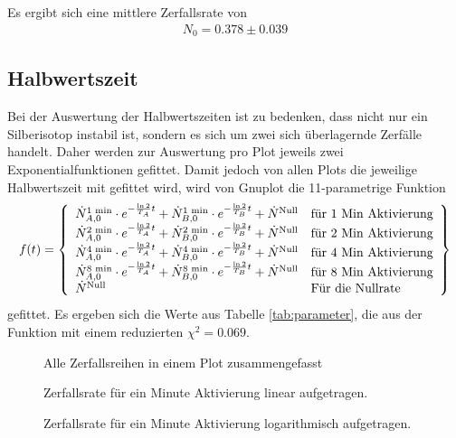 \documentclass[12pt,a4paper,titlepage,headinclude,bibtotoc]{scrartcl}
\begin{document}
Es ergibt sich eine mittlere Zerfallsrate von 
\begin{align}
N_0=0.378\pm 0.039\label{eq:nullrate}
\end{align}


\subsection{Halbwertszeit}
Bei der Auswertung der Halbwertszeiten ist zu bedenken, dass nicht nur ein Silberisotop instabil ist, sondern es sich um zwei sich überlagernde Zerfälle handelt.
Daher werden zur Auswertung pro Plot jeweils zwei Exponentialfunktionen gefittet.
Damit jedoch von allen Plots die jeweilige Halbwertszeit mit gefittet wird, wird von Gnuplot die 11-parametrige Funktion 
\begin{align}
	f(t)=\left\{
		\begin{array}[]{l  l}
\dot{N}_{A,0}^{1\text{ min}}\cdot e^{-\frac{\ln 2}{T_A}t}+\dot{N}_{B,0}^{1\text{ min}}\cdot e^{-\frac{\ln 2}{T_B}t}+\dot{N}^{\text{Null}}&\text{für 1 Min Aktivierung}\\
\dot{N}_{A,0}^{2\text{ min}}\cdot e^{-\frac{\ln 2}{T_A}t}+\dot{N}_{B,0}^{2\text{ min}}\cdot e^{-\frac{\ln 2}{T_B}t}+\dot{N}^{\text{Null}}&\text{für 2 Min Aktivierung}\\
\dot{N}_{A,0}^{4\text{ min}}\cdot e^{-\frac{\ln 2}{T_A}t}+\dot{N}_{B,0}^{4\text{ min}}\cdot e^{-\frac{\ln 2}{T_B}t}+\dot{N}^{\text{Null}}&\text{für 4 Min Aktivierung}\\
\dot{N}_{A,0}^{8\text{ min}}\cdot e^{-\frac{\ln 2}{T_A}t}+\dot{N}_{B,0}^{8\text{ min}}\cdot e^{-\frac{\ln 2}{T_B}t}+\dot{N}^{\text{Null}}&\text{für 8 Min Aktivierung}\\
\dot{N}^\text{Null}&\text{Für die Nullrate}
\end{array}
	 \right\}
	\label{eq:funktion}
\end{align}
gefittet.
Es ergeben sich die Werte aus Tabelle \ref{tab:parameter}, die aus der Funktion mit einem reduzierten $\chi^2 = 0.069$.


\begin{figure}[h]
\centering

\caption{Alle Zerfallsreihen in einem Plot zusammengefasst}
\label{fig:alle}
\end{figure}
\newpage
\begin{figure}[h]
\centering

\caption{Zerfallsrate für ein Minute Aktivierung linear aufgetragen.}
\label{fig:1min}
\end{figure}
\begin{figure}[h]
\centering

\caption{Zerfallsrate für ein Minute Aktivierung logarithmisch aufgetragen.}
\label{fig:1minlog}
\end{figure}
\end{document}
